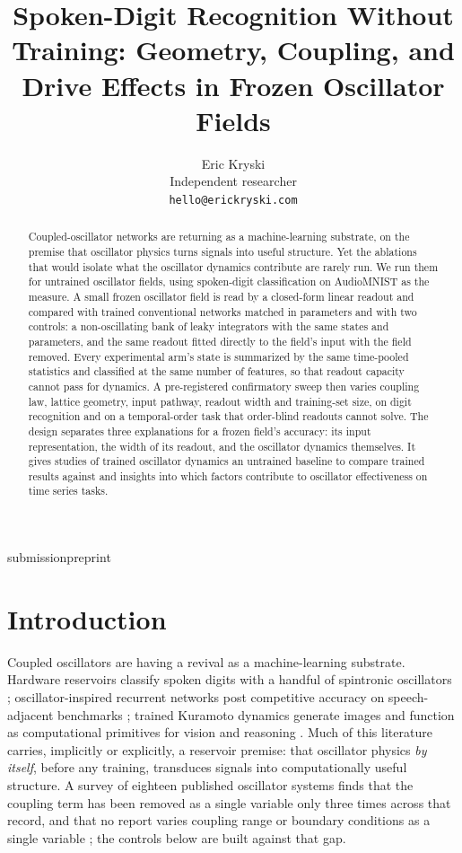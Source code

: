 \documentclass{article}
\title{Spoken-Digit Recognition Without Training: Geometry, Coupling,
and Drive Effects in Frozen Oscillator Fields}
\author{Eric Kryski \\
Independent researcher \\
\texttt{hello@erickryski.com}}
\makeatletter
\newcommand{\iclr@floatbarrier}{\par\vspace{\z@}%
  \ifx\@deferlist\@empty\else\clearpage\fi}
\let\iclr@section\section
\renewcommand{\section}{\iclr@floatbarrier\iclr@section}
\makeatother
\begin{document}
\maketitle
\def\iclrface{submission}\def\iclrpreprint{preprint}
\ifx\iclrface\iclrpreprint\lhead{}\fi
\begin{abstract}
Coupled-oscillator networks are returning as a machine-learning
substrate, on the premise that oscillator physics turns signals into
useful structure. Yet the ablations that would isolate what the
oscillator dynamics contribute are rarely run. We run them for untrained
oscillator fields, using spoken-digit classification on AudioMNIST as
the measure. A small frozen oscillator field is read by a closed-form
linear readout and compared with trained conventional networks matched
in parameters and with two controls: a non-oscillating bank of leaky
integrators with the same states and parameters, and the same readout
fitted directly to the field's input with the field removed. Every
experimental arm's state is summarized by the same time-pooled
statistics and classified at the same number of features, so that
readout capacity cannot pass for dynamics. A pre-registered confirmatory
sweep then varies coupling law, lattice geometry, input pathway, readout
width and training-set size, on digit recognition and on a
temporal-order task that order-blind readouts cannot solve. The design
separates three explanations for a frozen field's accuracy: its input
representation, the width of its readout, and the oscillator dynamics
themselves. It gives studies of trained oscillator dynamics an untrained
baseline to compare trained results against and insights into which
factors contribute to oscillator effectiveness on time series tasks.
\end{abstract}

\section{Introduction}\label{introduction}

Coupled oscillators are having a revival as a machine-learning
substrate. Hardware reservoirs classify spoken digits with a handful of
spintronic oscillators \citep{torrejon2017}; oscillator-inspired
recurrent networks post competitive accuracy on speech-adjacent
benchmarks \citep{rusch2021}; trained Kuramoto dynamics generate images
\citep{unconv-ai2026} and function as computational primitives for
vision and reasoning \citep{miyato2025}. Much of this literature
carries, implicitly or explicitly, a reservoir premise: that oscillator
physics \emph{by itself}, before any training, transduces signals into
computationally useful structure. A survey of eighteen published
oscillator systems finds that the coupling term has been removed as a
single variable only three times across that record, and that no report
varies coupling range or boundary conditions as a single variable
\citep{kryski2026}; the controls below are built against that gap.
\end{document}
